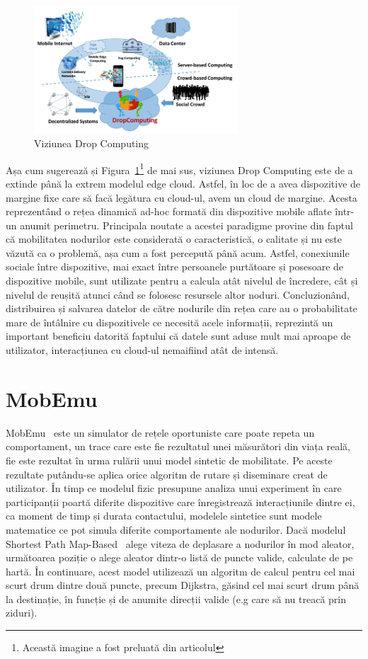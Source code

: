 \documentclass[12pt,a4paper]{report}
\begin{document}
\begin{figure}[th]
\centering
\includegraphics[width=3in]{pics/dropComputing.png}
  \caption{Viziunea Drop Computing}
  \label{fig:pic2}
\end{figure}
Așa cum sugerează și Figura~\ref{fig:pic2}\footnote{Această imagine a fost preluată din articolul\cite{DC}} de mai sus, viziunea Drop Computing este de a extinde până la extrem modelul edge cloud. Astfel, în loc de a avea dispozitive de margine fixe care să facă legătura cu cloud-ul, avem un cloud de margine. Acesta reprezentând o rețea dinamică ad-hoc formată din dispozitive mobile aflate într-un anumit perimetru. Principala noutate a acestei paradigme provine din faptul că mobilitatea nodurilor este considerată o caracteristică, o calitate și nu este văzută ca o problemă, așa cum a fost percepută până acum. Astfel, conexiunile sociale între dispozitive, mai exact între persoanele purtătoare și posesoare de dispozitive mobile, sunt utilizate pentru a calcula atât nivelul de încredere, cât și nivelul de reușită atunci când se folosesc resursele altor noduri. Concluzionând, distribuirea și salvarea datelor de către nodurile din rețea care au o probabilitate mare de întâlnire cu dispozitivele ce necesită acele informații, reprezintă un important beneficiu datorită faptului că datele sunt aduse mult mai aproape de utilizator, interacțiunea cu cloud-ul nemaifiind atât de intensă.
\section{MobEmu}
MobEmu~\cite{MobEmuArticle} este un simulator de rețele oportuniste care poate repeta un comportament, un trace care este fie rezultatul unei măsurători din viața reală, fie este rezultat în urma rulării unui model sintetic de mobilitate. Pe aceste rezultate putându-se aplica orice algoritm de rutare și diseminare creat de utilizator.
În timp ce modelul fizic presupune analiza unui experiment în care participanții poartă diferite dispozitive care înregistrează interacțiunile dintre ei, ca moment de timp și durata contactului, modelele sintetice sunt modele matematice ce pot simula diferite comportamente ale nodurilor. Dacă modelul Shortest Path Map-Based~\cite{ShortestPathMapBased} alege viteza de deplasare a nodurilor în mod aleator, următoarea poziție o alege aleator dintr-o listă de puncte valide, calculate de pe hartă. În continuare, acest model utilizează un algoritm de calcul pentru cel mai scurt drum dintre două puncte, precum Dijkstra, găsind cel mai scurt drum până la destinație, în funcție și de anumite direcții valide (e.g care să nu treacă prin ziduri). 
\end{document}
